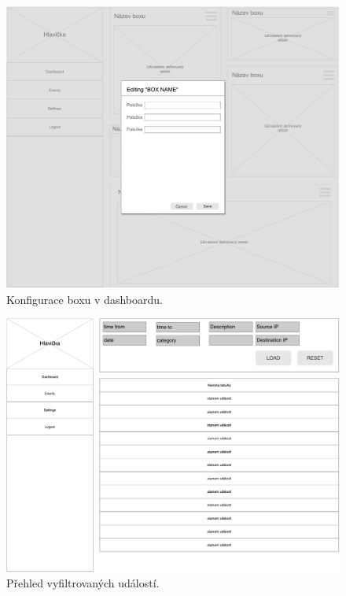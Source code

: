 \begin{figure}[ht]
    \centering
    \includegraphics[width=1\textwidth]{fig/wf_dashboard_edit.pdf}
    \caption{Konfigurace boxu v dashboardu.} \label{wf:dashboard_edit}
\end{figure}


\begin{figure}[ht]
    \centering
    \includegraphics[width=1\textwidth]{fig/wf_dashboard_events.pdf}
    \caption{Přehled vyfiltrovaných událostí.} \label{wf:dashboard_events}
\end{figure}

